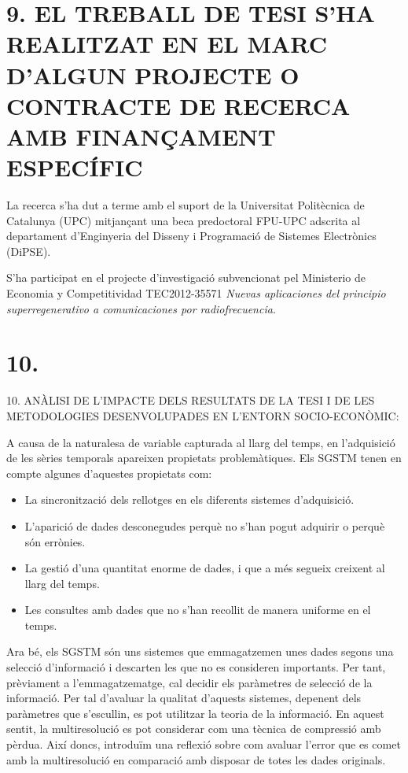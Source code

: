 \documentclass{article}
\begin{document}
\section*{9. EL TREBALL DE TESI S’HA REALITZAT EN EL MARC D’ALGUN PROJECTE O CONTRACTE DE RECERCA AMB FINANÇAMENT ESPECÍFIC}


La recerca s'ha dut a terme amb el suport de la Universitat
Politècnica de Catalunya (UPC) mitjançant una beca predoctoral FPU-UPC
adscrita al departament d'Enginyeria del Disseny i Programació de
Sistemes Electrònics (DiPSE).

S'ha participat en el projecte d'investigació subvencionat pel Ministerio de Economia y Competitividad TEC2012-35571 \emph{Nuevas
aplicaciones del principio superregenerativo a comunicaciones por
radiofrecuencia}. 




\section{10.}
10. ANÀLISI DE L’IMPACTE DELS RESULTATS DE LA TESI I DE LES METODOLOGIES DESENVOLUPADES EN L’ENTORN SOCIO-ECONÒMIC:
  


A causa de la naturalesa de variable capturada al llarg del temps, en
l'adquisició de les sèries temporals apareixen propietats
problemàtiques. Els SGSTM tenen en compte algunes d'aquestes
propietats com:
\begin{itemize}
\item La sincronització dels rellotges en els diferents sistemes
  d'adquisició.
\item L'aparició de dades desconegudes perquè no s'han pogut adquirir
  o perquè són errònies.
\item La gestió d'una quantitat enorme de dades, i que a més segueix
  creixent al llarg del temps.
\item Les consultes amb dades que no s'han recollit de manera uniforme
  en el temps.
\end{itemize}


Ara bé, els SGSTM són uns sistemes que emmagatzemen unes dades
segons una selecció d'informació i descarten les que no es consideren
importants. Per tant, prèviament a l'emmagatzematge, cal decidir els
paràmetres de selecció de la informació. Per tal d'avaluar la qualitat
d'aquests sistemes, depenent dels paràmetres que s'escullin, es pot
utilitzar la teoria de la informació. En aquest sentit, la
multiresolució es pot considerar com una tècnica de compressió amb
pèrdua. Així doncs, introduïm una reflexió sobre com avaluar l'error
que es comet amb la multiresolució en comparació amb disposar de totes
les dades originals.
\end{document}
